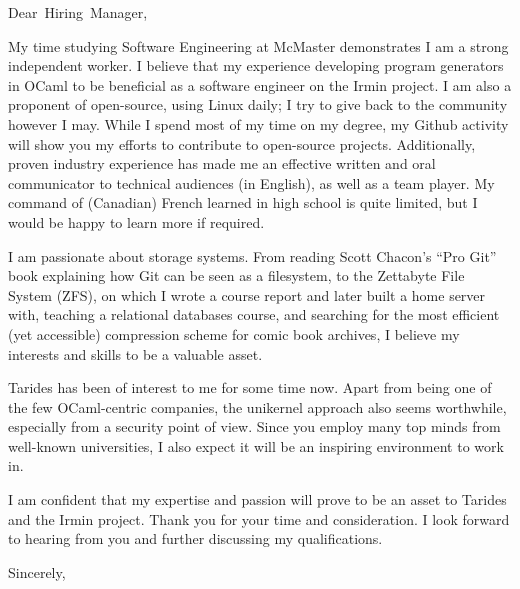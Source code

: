 \documentclass[
fontsize=12pt,
paper=letter,
parskip=half,
enlargefirstpage=on,    %
fromalign=right,        %
fromphone=on,           %
fromemail=on,
fromrule=aftername,     %
addrfield=off,           %
backaddress=off,         %
subject=beforeopening,  %
locfield=narrow,        %
foldmarks=off,           %
]{scrlttr2}
\renewcommand{\\}{\ {\large\textperiodcentered}\ }
\begin{document}

\begin{letter}{}


\opening{Dear~Hiring~Manager,}

My time studying Software Engineering at McMaster demonstrates I am a strong independent worker.
I believe that my experience developing program generators in OCaml to be beneficial as a software engineer on the Irmin project.
I am also a proponent of open-source, using Linux daily; I try to give back to the community however I may.
While I spend most of my time on my degree, my Github activity will show you my efforts to contribute to open-source projects.
Additionally, proven industry experience has made me an effective written and oral communicator to technical audiences (in English), as well as a team player.
My command of (Canadian) French learned in high school is quite limited, but I would be happy to learn more if required. 


I am passionate about storage systems.
From reading Scott Chacon's ``Pro Git'' book explaining how Git can be seen as a filesystem, to the Zettabyte File System (ZFS), on which I wrote a course report and later built a home server with, teaching a relational databases course, and searching for the most efficient (yet accessible) compression scheme for comic book archives, I believe my interests and skills to be a valuable asset.

Tarides has been of interest to me for some time now.
Apart from being one of the few OCaml-centric companies, the unikernel approach also seems worthwhile, especially from a security point of view.
Since you employ many top minds from well-known universities, I also expect it will be an inspiring environment to work in.

I am confident that my expertise and passion will prove to be an asset to Tarides and the Irmin project.
Thank you for your time and consideration.
I look forward to hearing from you and further discussing my qualifications.
\closing{Sincerely,}


\end{letter}
\end{document}
